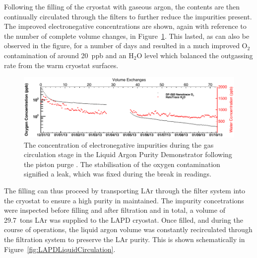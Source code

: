 Following the filling of the cryostat with gaseous argon, the contents are then continually circulated through the filters to further reduce the impurities present.  The improved electronegative concentrations are shown, again with reference to the number of complete volume changes, in Figure~\ref{fig:LAPDGasCirculation}.  This lasted, as can also be observed in the figure, for a number of days and resulted in a much improved O$_2$ contamination of around 20~ppb and an H$_2$O level which balanced the outgassing rate from the warm cryostat surfaces.

\begin{figure}
  \centering
  \includegraphics[width=0.7\linewidth]{LAPDGasCirculation.pdf}
  \caption[The concentration of electronegative impurities during the gas circulation stage in the Liquid Argon Purity Demonstrator following the piston purge.]{The concentration of electronegative impurities during the gas circulation stage in the Liquid Argon Purity Demonstrator following the piston purge \cite{LAPDJINST2014}.  The stabilisation of the oxygen contamination signified a leak, which was fixed during the break in readings.}
  \label{fig:LAPDGasCirculation}
\end{figure}

The filling can thus proceed by transporting LAr through the filter system into the cryostat to ensure a high purity in maintained.  The impurity concetrations were inspected before filling and after filtration and in total, a volume of 29.7~tons LAr was supplied to the LAPD cryostat.  Once filled, and during the course of operations, the liquid argon volume was constantly recirculated through the filtration system to preserve the LAr purity.  This is shown schematically in Figure~\ref{fig:LAPDLiquidCirculation}.

